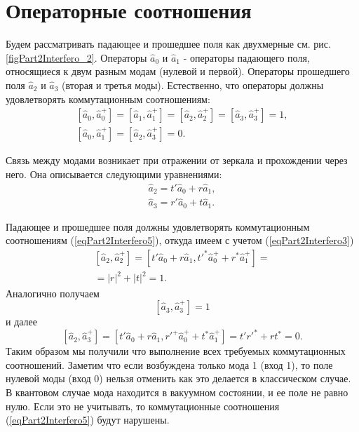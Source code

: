 \section{Операторные соотношения}
Будем рассматривать падающее и прошедшее поля как двухмерные
см. рис. \ref{figPart2Interfero_2}. Операторы $\hat{a}_0$ и 
$\hat{a}_1$ - операторы падающего поля, относящиеся к двум разным модам
(нулевой и первой). Операторы прошедшего поля $\hat{a}_2$ и 
$\hat{a}_3$ (вторая и третья моды). Естественно, что операторы должны
удовлетворять коммутационным соотношениям:
\begin{eqnarray}
\left[\hat{a}_0, \hat{a}_0^{+}\right] = 
\left[\hat{a}_1, \hat{a}_1^{+}\right] = 
\left[\hat{a}_2, \hat{a}_2^{+}\right] = 
\left[\hat{a}_3, \hat{a}_3^{+}\right] = 1,
\nonumber \\
\left[\hat{a}_0, \hat{a}_1^{+}\right] = 
\left[\hat{a}_2, \hat{a}_3^{+}\right] = 0.
\label{eqPart2Interfero5}
\end{eqnarray}



Связь между модами возникает при отражении от зеркала и прохождении
через него. Она описывается следующими уравнениями:
\begin{eqnarray}
\hat{a}_2 = t' \hat{a}_0 + r \hat{a}_1,
\nonumber \\
\hat{a}_3 = r' \hat{a}_0 + t \hat{a}_1.
\label{eqPart2Interfero6}
\end{eqnarray}

Падающее и прошедшее поля должны удовлетворять коммутационным
соотношениям (\ref{eqPart2Interfero5}), откуда имеем  с учетом 
(\ref{eqPart2Interfero3})
\begin{eqnarray}
\left[\hat{a}_2, \hat{a}_2^{+}\right] = 
\left[t' \hat{a}_0 + r \hat{a}_1, t'^{*} \hat{a}_0^{+} + r^{*}
  \hat{a}_1^{+}\right] =
\nonumber \\ = 
\left|r\right|^2 + \left|t\right|^2 = 1.
\label{eqPart2InterferoTask2a}
\end{eqnarray}
Аналогично получаем 
\begin{equation}
\left[\hat{a}_3, \hat{a}_3^{+}\right] = 1 
\label{eqPart2InterferoTask2b}
\end{equation}
и далее
\begin{equation}
\left[\hat{a}_2, \hat{a}_3^{+}\right] = 
\left[t' \hat{a}_0 + r \hat{a}_1, 
r'^{+} \hat{a}_0^{+} + t^{*} \hat{a}_1^{+}\right] = 
t' r'^{*} + r t^{*} = 0.
\label{eqPart2InterferoTask2c}
\end{equation}
Таким образом мы получили что выполнение всех требуемых коммутационных
соотношений. Заметим что если возбуждена только мода 1 (вход 1), то
поле нулевой моды (вход 0) нельзя отменить как это делается в
классическом случае. В квантовом случае мода находится в вакуумном
состоянии, и ее поле не равно нулю. Если это не учитывать, то
коммутационные соотношения (\ref{eqPart2Interfero5}) будут нарушены.

